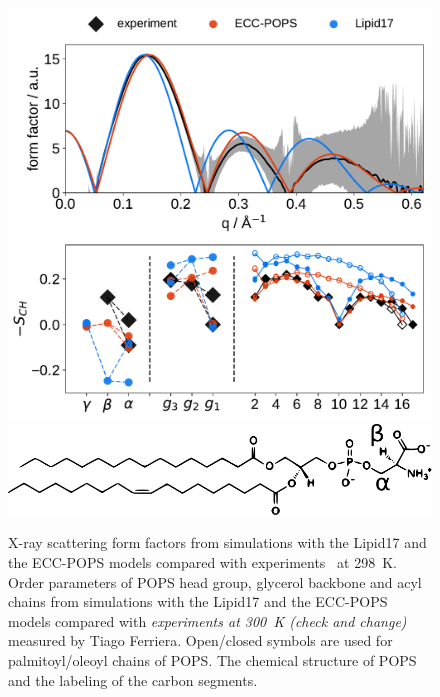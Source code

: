 \begin{figure}[tb!] 
  \centering 
  \includegraphics[width=\figwidth]{../img/ecc_pops/Order-parameters_form-factors_exp-L17-ECC-lipids.pdf}
  \includegraphics[width=\figwidth]{../img/ecc_pops/pops_chemfig.pdf} 
\hfill
  \caption{\label{simVSexpNOions_POPS} 
    X-ray scattering form factors from simulations with the Lipid17 \citep{lipid17-future} and 
    the ECC-POPS models compared with experiments~\citep{kucerka14} at 298~K. 
    Order parameters of POPS head group, glycerol backbone and acyl chains  
    from simulations with the Lipid17 \citep{lipid17-future} and the ECC-POPS models 
    compared with \emph{experiments at 300~K (check and change)} measured by Tiago Ferriera. 
    Open/closed symbols are used for palmitoyl/oleoyl chains of POPS. 
    The chemical structure of POPS and the labeling of the carbon segments. 
  }  
\end{figure} 
 
